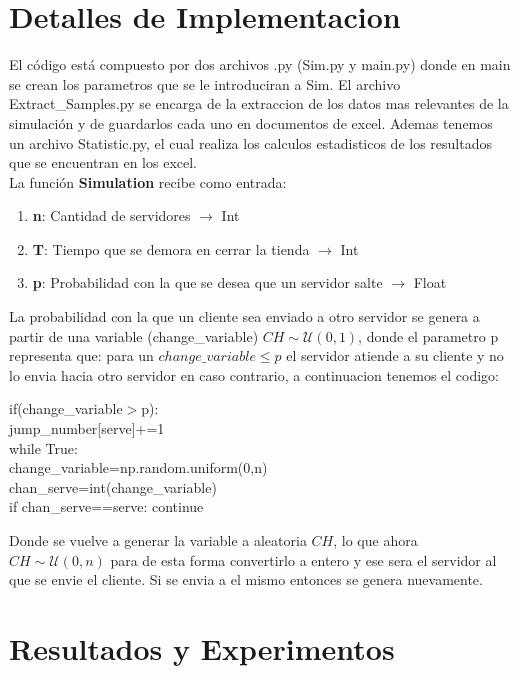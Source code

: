 \documentclass{article}
\begin{document}
\section{Detalles de Implementacion}

El código está compuesto por dos archivos .py (Sim.py y main.py) donde en main se crean los parametros que se le introduciran a Sim.
El archivo Extract\_Samples.py se encarga de la extraccion de los datos mas relevantes de la simulación y de guardarlos cada uno en
documentos de excel. Ademas tenemos un archivo Statistic.py, el cual realiza los calculos estadisticos de los resultados que se encuentran en
los excel.\\
La función \textbf{Simulation} recibe como entrada:
\begin{enumerate}
\item{\textbf{n}: Cantidad de servidores $\rightarrow$ Int}
\item{\textbf{T}: Tiempo que se demora en cerrar la tienda $\rightarrow$ Int}
\item{\textbf{p}: Probabilidad con la que se desea que un servidor salte $\rightarrow$ Float}
\end{enumerate}
La probabilidad con la que un cliente sea enviado a otro servidor se genera a partir de una variable (change\_variable) $CH \sim \mathcal{U}(0,1)$, donde 
el parametro p representa que: para un $change\_variable \leq p$ el servidor atiende a su cliente y no lo envia hacia otro servidor en caso contrario, a continuacion tenemos el codigo:
\begin{tcolorbox}
if(change\_variable$>$p):\\
	jump\_number[serve]+=1\\
                while True:\\
                    change\_variable=np.random.uniform(0,n)\\
                    chan\_serve=int(change\_variable)\\
                    if chan\_serve==serve: continue\\

\end{tcolorbox}
Donde se vuelve a generar la variable a aleatoria $CH$, lo que ahora $CH\sim\mathcal{U}(0,n)$ para de esta forma convertirlo a entero y ese sera el servidor al que se envie el cliente. Si se envia a el mismo entonces se genera nuevamente.
\section{Resultados y Experimentos}
\end{document}
